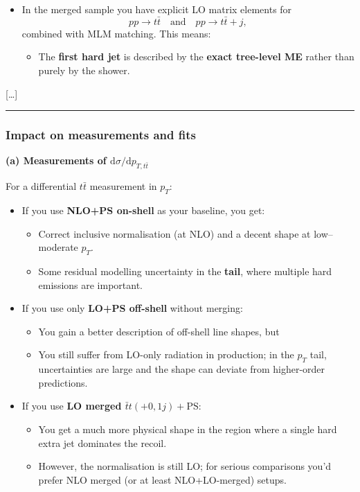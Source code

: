 \documentclass[submission, Phys]{SciPost}
\begin{document}
\begin{promptblock}
\begin{itemize}
  \item In the merged sample you have explicit LO matrix elements for
  \[
    pp \to t\bar t \quad \text{and} \quad pp \to t\bar t + j,
  \]
  combined with MLM matching. This means:
  \begin{itemize}
    \item The \textbf{first hard jet} is described by the \textbf{exact tree-level ME} rather than purely by the shower.
  \end{itemize}
\end{itemize}
[\ldots]

\vspace{1em}
\hrule

\subsubsection*{Impact on measurements and fits}
\textbf{(a) Measurements of $\mathrm{d}\sigma/\mathrm{d}p_{T,t\bar t}$}

For a differential $t\bar t$ measurement in $p_T$:
\begin{itemize}
  \item If you use \textbf{NLO+PS on-shell} as your baseline, you get:
  \begin{itemize}
    \item Correct inclusive normalisation (at NLO) and a decent shape at low--moderate $p_T$.
    \item Some residual modelling uncertainty in the \textbf{tail}, where multiple hard emissions are important.
  \end{itemize}

  \item If you use only \textbf{LO+PS off-shell} without merging:
  \begin{itemize}
    \item You gain a better description of off-shell line shapes, but
    \item You still suffer from LO-only radiation in production; in the $p_T$ tail, uncertainties are large and the shape can deviate from higher-order predictions.
  \end{itemize}

  \item If you use \textbf{LO merged $\bar t t(+0,1j)+\mathrm{PS}$}:
  \begin{itemize}
    \item You get a much more physical shape in the region where a single hard extra jet dominates the recoil.
    \item However, the normalisation is still LO; for serious comparisons you’d prefer NLO merged (or at least NLO+LO-merged) setups.
  \end{itemize}
\end{itemize}


\end{promptblock}
\end{document}
